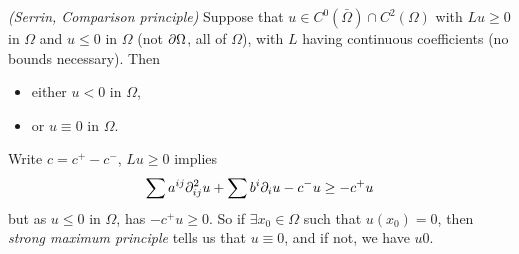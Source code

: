 \documentclass[12pt,a4paper]{article}
\newenvironment{proof}
{\begin{changemargin}{0.5cm}{0.5cm} 
	}%
	{\end{changemargin}
}
\renewenvironment{i}
{\begin{itemize} 
	}%
	{\end{itemize}
}
\newenvironment{p}
{\begin{proof} 
	}%
	{\end{proof}
}
\begin{document}
\thm \emph{(Serrin, Comparison principle)} Suppose that $u\in C^0(\bar{\Omega}) \cap C^2(\Omega)$ with $Lu \geq 0$ in $\Omega$ and $u\leq 0$ in $\Omega$ (not $\partial \Omega$, all of $\Omega$), with $L$ having continuous coefficients (no bounds necessary). Then
\begin{i}
\item either $u< 0$ in $\Omega$,
\item or $u\equiv 0$ in $\Omega$.
\end{i}
\begin{p}
\pf Write $c= c^+ - c^-$, $Lu \geq 0$ implies
\begin{align*}
\sum a^{ij} \partial^2_{ij} u + \sum b^i \partial_{i} u - c^- u \geq - c^+ u 
\end{align*}
but as $u\leq 0$ in $\Omega$, has $-c^+ u \geq 0$. So if $\exists x_0 \in \Omega$ such that $u(x_0)=0$, then \emph{strong maximum principle} tells us that $u\equiv 0$, and if not, we have $u 0$.

\eop
\end{p}
\s
\end{document}
